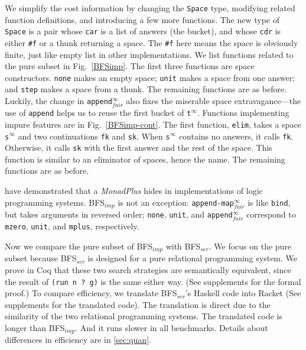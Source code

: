 \documentclass[format=acmlarge, review=false, authordraft=false]{acmart}
\newcommand{\appendInfFair}{\texttt{append$^\infty_{fair}$}}
\newcommand{\appendMapInfFair}{\texttt{append-map$^\infty_{fair}$}}
\newcommand{\sInf}{\texttt{s$^\infty$}}
\newcommand{\tInf}{\texttt{t$^\infty$}}
\newcommand{\BFSser}[0]{BFS$_{ser}$}
\newcommand{\BFSimp}[0]{BFS$_{imp}$}
\begin{document}
We simplify the cost information by changing the \texttt{Space} type, 
modifying related function definitions, and introducing a few more functions.
The new type of \texttt{Space} is a pair whose \texttt{car} is a list of 
answers (the bucket), and whose \texttt{cdr} is either \texttt{\#{}f} or a 
thunk returning a space. The \texttt{\#{}f} here means the space is obviously 
finite, just like empty list in other implementations.
We list functions related to the pure subset in Fig.~\ref{BFSimp}. The first 
three functions are space constructors. \texttt{none} makes an empty space; 
\texttt{unit} makes a space from one answer; and \texttt{step} makes a space 
from a thunk. The remaining functions are as before. 
Luckily, the change in \appendInfFair{} also fixes the miserable space 
extravagance---the use of \texttt{append} helps us to reuse the first 
bucket of \tInf{}. 
Functions implementing impure features are in Fig.~\ref{BFSimp-cont}. The 
first function, \texttt{elim}, takes a space \sInf{} and two 
continuations \texttt{fk} and \texttt{sk}. When \sInf{} contains 
no answers, it calls \texttt{fk}. Otherwise, it calls 
\texttt{sk} with the first answer and the rest of the space. This function is 
similar to an eliminator of spaces, hence the name. The remaining 
functions are as before.

\citet{kiselyov2005backtracking} have demonstrated that a \emph{MonadPlus} 
hides in implementations of logic programming systems. \BFSimp{} is not an 
exception: \appendMapInfFair{} is like \texttt{bind}, but takes 
arguments in reversed order; \texttt{none}, \texttt{unit}, and 
\appendInfFair{} correspond to \texttt{mzero}, \texttt{unit}, and 
\texttt{mplus}, respectively.


Now we compare the pure subset of \BFSimp{} with \BFSser{}. We 
focus on the pure subset because \BFSser{} is designed for a pure 
relational programming system. We prove in Coq that these two search strategies 
are semantically equivalent, since the result of \texttt{(run n ? g)} is 
the same either way. (See supplements for the formal proof.) To 
compare efficiency, we translate \BFSser{}'s Haskell code into Racket (See 
supplements for the translated code). The translation is direct due to the 
similarity of the two relational programming systems. The translated code is 
longer than \BFSimp{}. And it runs slower in all benchmarks. Details about 
differences in efficiency are in \autoref{sec:quan}.
\end{document}
